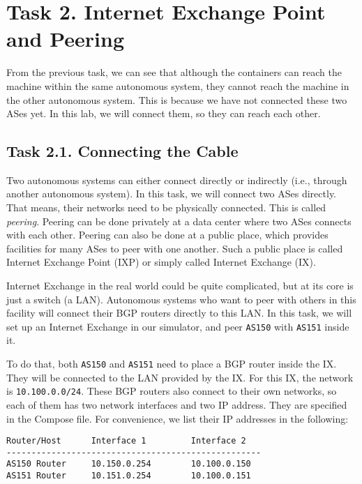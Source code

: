 \section{Task 2. Internet Exchange Point and Peering}


From the previous task, we can see that 
although the containers can reach the machine within
the same autonomous system, they cannot reach
the machine in the other autonomous system. 
This is because we have not connected these two ASes 
yet. In this lab, we will connect them, so they 
can reach each other. 



\subsection{Task 2.1. Connecting the Cable} 

Two autonomous systems can either connect directly or 
indirectly (i.e., through another autonomous system). 
In this task, we will connect two ASes directly. That means,
their networks need to be physically connected.
This is called \textit{peering}. Peering can be done
privately at a data center where two ASes 
connects with each other. Peering can also be 
done at a public place, which provides facilities
for many ASes to peer with one another. Such a
public place is called Internet Exchange Point (IXP) 
or simply called Internet Exchange (IX).

Internet Exchange in the real world could be quite complicated, 
but at its core is just a switch (a LAN). Autonomous systems
who want to peer with others in this facility
will connect their BGP routers directly
to this LAN. In this task, we will set up
an Internet Exchange in our simulator, and 
peer \texttt{AS150} with \texttt{AS151} inside it.


To do that, both \texttt{AS150} and \texttt{AS151} need to
place a BGP router inside the IX. They will be 
connected to the LAN provided by the IX. 
For this IX, the network is \texttt{10.100.0.0/24}. 
These BGP routers also connect to their own networks, so 
each of them has two network interfaces and two
IP address. They are specified in the Compose file.
For convenience, we list their IP addresses
in the following:

\begin{lstlisting}
Router/Host      Interface 1         Interface 2
---------------------------------------------------
AS150 Router     10.150.0.254        10.100.0.150
AS151 Router     10.151.0.254        10.100.0.151
\end{lstlisting}

